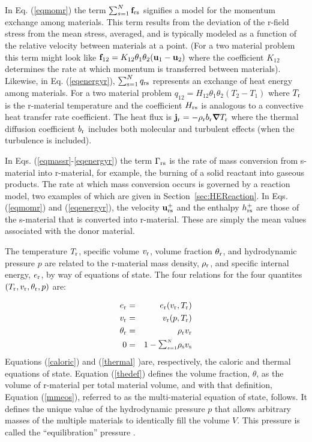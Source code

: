 In Eq. (\ref{eqmomr}) the term $\sum_{s=1}^{N}\bff_{\rmr\rms}$ signifies
a model for the momentum exchange among materials.  This term results from
the deviation of the r-field stress from the mean stress, averaged, and is
typically modeled as a function of the relative velocity between materials
at a point. (For a two material problem this term might look like $\bff_{12}
= K_{12}\theta_1\theta_2(\bfu_1 - \bfu_2)$ where the coefficient $K_{12}$
determines the rate at which momentum is transferred between materials).
Likewise, in Eq. (\ref{eqenergyr}), $\sum_{\rms=1}^{N} q_{\rmr\rms}$
represents an exchange of heat energy among materials.  For a two material
problem $q_{12} = H_{12}\theta_1\theta_2(T_2 - T_1)$ where $T_\rmr$ is the
r-material temperature and the coefficient $H_{\rmr\rms}$ is analogous to a
convective heat transfer rate coefficient.  The heat flux is $\bfj_\rmr =
-\rho_\rmr b_\rmr \bnabla T_\rmr$ where the thermal diffusion coefficient
$b_\rmr$ includes both molecular and turbulent effects (when the turbulence
is included).

In Eqs. (\ref{eqmassr}-\ref{eqenergyr}) the term $\Gamma_{\rmr\rms}$ is
the rate of mass conversion from s-material into r-material, for example,
the burning of a solid reactant into gaseous products.  The rate at which
mass conversion occurs is governed by a reaction model, two examples of
which are given in Section~\ref{sec:HEReaction}.  In Eqs. (\ref{eqmomr})
and (\ref{eqenergyr}), the velocity $\bfu_{\rmr\rms}^+$ and the enthalpy
$h_{\rmr\rms}^+$ are those of the s-material that is converted into r-material.
These are simply the mean values associated with the donor material.

The temperature $T_\rmr$, specific volume $v_\rmr$, volume fraction
$\theta_\rmr$, and hydrodynamic pressure $p$ are related to the r-material
mass density, $\rho_\rmr$, and specific internal energy, $e_\rmr$, by way
of equations of state.  The four relations for the four quantites $(T_\rmr,
v_\rmr, \theta_\rmr, p)$ are:

%
\begin{eqnarray}
e_\rmr &=& e_\rmr(v_\rmr, T_\rmr) \label{caloric} \\
v_\rmr &=& v_\rmr(p, T_\rmr) \label{thermal} \\
\theta_\rmr &=& \rho_\rmr v_\rmr \label{thedef} \\
0 &=& 1 - {\raise1.5pt\hbox{$\scriptstyle\sum_{s=1}^N$}}\rho_\rms v_\rms
\label{mmeos}
\end{eqnarray}
%
Equations (\ref{caloric}) and (\ref{thermal} )are, respectively, the caloric
and thermal equations of state.  Equation (\ref{thedef}) defines the volume
fraction, $\theta$, as the volume of r-material per total material volume,
and with that definition, Equation (\ref{mmeos}), referred to as the
multi-material equation of state, follows.  It defines the unique value of
the hydrodynamic pressure $p$ that allows arbitrary masses of the multiple
materials to identically fill the volume $V$.  This pressure is called the
``equilibration'' pressure \cite{kashiwaICE94}.

